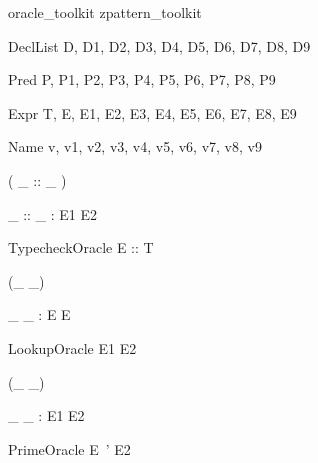 \documentclass{article}
\begin{document}
\begin{zsection}
  \SECTION oracle\_toolkit \parents zpattern\_toolkit
\end{zsection}

\begin{zedjoker}{DeclList} D, D1, D2, D3, D4, D5, D6, D7, D8, D9 \end{zedjoker}
\begin{zedjoker}{Pred} P, P1, P2, P3, P4, P5, P6, P7, P8, P9 \end{zedjoker}
\begin{zedjoker}{Expr} T, E, E1, E2, E3, E4, E5, E6, E7, E8, E9 \end{zedjoker}
\begin{zedjoker}{Name} v, v1, v2, v3, v4, v5, v6, v7, v8, v9 \end{zedjoker}

\begin{zed}
  \relation ( \_ :: \_ )
\end{zed}

\begin{gendef}[E1,E2]
  \_ :: \_ : E1 \rel E2
\end{gendef}

\begin{zedoracle}{TypecheckOracle}
  E :: T
\end{zedoracle}




\begin{zed}
  \relation (\_ \hasDefn \_)
\end{zed}

\begin{gendef}[E]
  \_ \hasDefn \_ : E \rel E
\end{gendef}

\begin{zedoracle}{LookupOracle}
  E1 \hasDefn E2
\end{zedoracle}




\begin{zed}
  \relation (\_ \is \_)
\end{zed}

\begin{gendef}[E1,E2]
  \_ \is \_ : E1 \rel E2
\end{gendef}

\begin{zedoracle}{PrimeOracle}
  E~' \is E2
\end{zedoracle}
\end{document}
